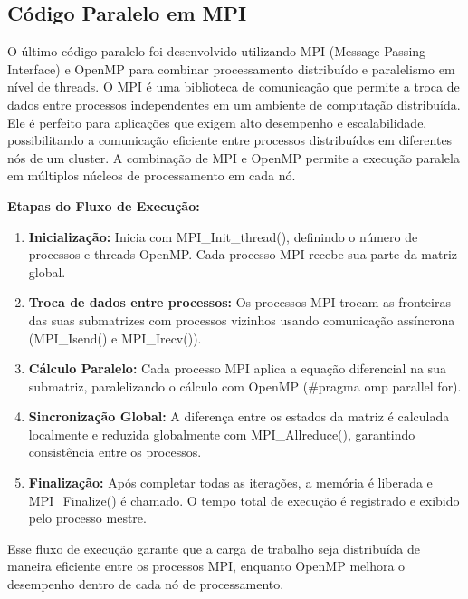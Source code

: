\documentclass[12pt]{article}
\begin{document}
\subsection{Código Paralelo em MPI}

O último código paralelo foi desenvolvido utilizando MPI (Message Passing
Interface) e OpenMP para combinar processamento distribuído e paralelismo em
nível de threads. O MPI é uma biblioteca de comunicação que permite a troca de
dados entre processos independentes em um ambiente de computação distribuída.
Ele é perfeito para aplicações que exigem alto desempenho e escalabilidade,
possibilitando a comunicação eficiente entre processos distribuídos em
diferentes nós de um cluster. A combinação de MPI e OpenMP permite a execução
paralela em múltiplos núcleos de processamento em cada nó.

\textbf{Etapas do Fluxo de Execução:}
\begin{enumerate}
  \item \textbf{Inicialização:} Inicia com MPI\_Init\_thread(), definindo o número de processos e threads OpenMP. Cada processo MPI recebe sua parte da matriz global.
  \item \textbf{Troca de dados entre processos:} Os processos MPI trocam as fronteiras das suas submatrizes com processos vizinhos usando comunicação assíncrona (MPI\_Isend() e MPI\_Irecv()).
  \item \textbf{Cálculo Paralelo:} Cada processo MPI aplica a equação diferencial na sua submatriz, paralelizando o cálculo com OpenMP (\#pragma omp parallel for).
  \item \textbf{Sincronização Global:} A diferença entre os estados da matriz é calculada localmente e reduzida globalmente com MPI\_Allreduce(), garantindo consistência entre os processos.
  \item \textbf{Finalização:} Após completar todas as iterações, a memória é liberada e MPI\_Finalize() é chamado. O tempo total de execução é registrado e exibido pelo processo mestre.
\end{enumerate}

Esse fluxo de execução garante que a carga de trabalho seja distribuída de
maneira eficiente entre os processos MPI, enquanto OpenMP melhora o desempenho
dentro de cada nó de processamento.
\end{document}
